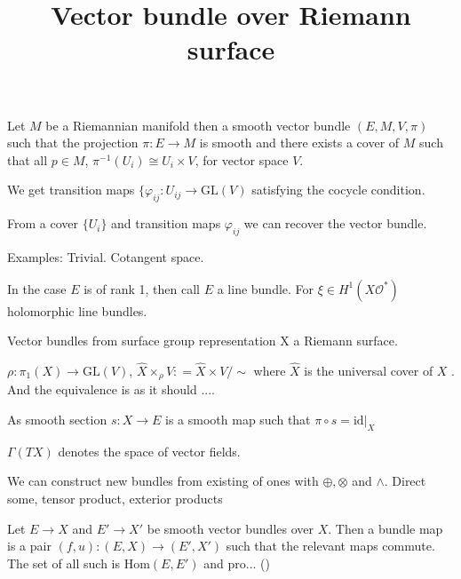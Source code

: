 % 


\title{Vector bundle over Riemann surface}
\author{}
\date{}

 
\maketitle

\begin{definition}
    Let $M$ be a Riemannian manifold 
    then a smooth vector bundle $(E, M, V, \pi) $ such that the projection 
    $ \pi : E \rightarrow  M $ is smooth and 
    there exists a cover of $M$ such that all $ p \in M $, $ \pi^{-1} (U_i) \cong U_i \times V $, for vector space $V$. 
\end{definition}

We get transition maps $ \{ \varphi_{ij} : U_{ij} \rightarrow  \mathrm{GL} ( V) $ satisfying the cocycle condition.

From a cover $\{U_i \} $ and transition maps $ \varphi _{ij} $ we can recover the vector bundle. 

Examples: 
Trivial. 
Cotangent space. 

In the case $ E$ is of rank 1, then call $E$ a line bundle. 
For $ \xi \in H^1( X \mathcal{O} ^* ) $ holomorphic line bundles. 

Vector bundles from surface group representation 
X a Riemann surface. 

$\rho : \pi_1 ( X) \rightarrow  \mathrm{GL} (V) $, 
$ \hat{X} \times _\rho V : = \hat{X} \times V / \sim $
where $ \hat{X} $ is the universal cover of $ X $ .
And the equivalence is as it should ....


\begin{definition}
 As smooth section $ s: X \rightarrow  E $ is a smooth map such that $ \pi \circ s  = \mathrm{id} | _ X $ 
\end{definition}

$\Gamma ( TX) $ denotes the space of vector fields.

We can construct new bundles from existing of ones with $ \oplus, \otimes$ and $ \wedge $. 
Direct some, tensor product, exterior products 

\begin{definition}
    Let $E \rightarrow X $ and $ E' \rightarrow  X' $ be smooth vector bundles over $ X$. 
    Then a bundle map is a pair $(f,u) : (E,X) \rightarrow  ( E', X') $ such that the relevant maps commute. 
    The set of all such is $\mathrm{Hom}(E, E') $ and pro... () 
\end{definition}

